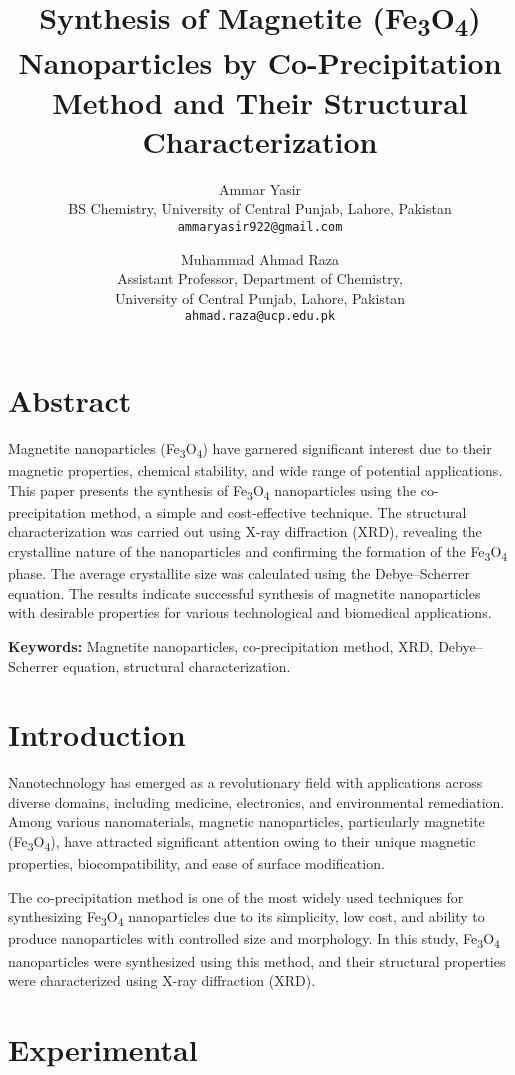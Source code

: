 \documentclass[12pt]{article}
\title{Synthesis of Magnetite (Fe\textsubscript{3}O\textsubscript{4}) Nanoparticles by Co-Precipitation Method and Their Structural Characterization}
\author{Ammar Yasir \\
BS Chemistry, University of Central Punjab, Lahore, Pakistan \\
\texttt{ammaryasir922@gmail.com} \\
\and
Muhammad Ahmad Raza \\
Assistant Professor, Department of Chemistry, \\
University of Central Punjab, Lahore, Pakistan \\
\texttt{ahmad.raza@ucp.edu.pk}
}
\date{}
\begin{document}
\maketitle

\section*{Abstract}
Magnetite nanoparticles (Fe\textsubscript{3}O\textsubscript{4}) have garnered significant interest due to their magnetic properties, chemical stability, and wide range of potential applications. This paper presents the synthesis of Fe\textsubscript{3}O\textsubscript{4} nanoparticles using the co-precipitation method, a simple and cost-effective technique. The structural characterization was carried out using X-ray diffraction (XRD), revealing the crystalline nature of the nanoparticles and confirming the formation of the Fe\textsubscript{3}O\textsubscript{4} phase. The average crystallite size was calculated using the Debye–Scherrer equation. The results indicate successful synthesis of magnetite nanoparticles with desirable properties for various technological and biomedical applications.

\textbf{Keywords:} Magnetite nanoparticles, co-precipitation method, XRD, Debye–Scherrer equation, structural characterization.

\section{Introduction}
Nanotechnology has emerged as a revolutionary field with applications across diverse domains, including medicine, electronics, and environmental remediation. Among various nanomaterials, magnetic nanoparticles, particularly magnetite (Fe\textsubscript{3}O\textsubscript{4}), have attracted significant attention owing to their unique magnetic properties, biocompatibility, and ease of surface modification.

The co-precipitation method is one of the most widely used techniques for synthesizing Fe\textsubscript{3}O\textsubscript{4} nanoparticles due to its simplicity, low cost, and ability to produce nanoparticles with controlled size and morphology. In this study, Fe\textsubscript{3}O\textsubscript{4} nanoparticles were synthesized using this method, and their structural properties were characterized using X-ray diffraction (XRD).

\section{Experimental}
\end{document}
